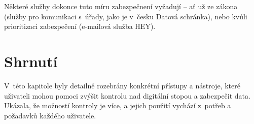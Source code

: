 Některé služby dokonce tuto míru zabezpečnení vyžadují -- ať už ze zákona (služby pro komunikaci s~úřady, jako je v~česku Datová schránka), nebo kvůli prioritizaci zabezpečení (e-mailová služba HEY).


\section*{Shrnutí}
V~této kapitole byly detailně rozebrány konkrétní přístupy a nástroje, které uživateli mohou pomoci zvýšit kontrolu nad digitální stopou a zabezpečit data.
Ukázala, že možností kontroly je více, a jejich použití vychází z~potřeb a požadavků každého uživatele.
